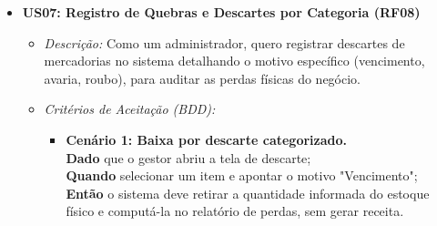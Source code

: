 \documentclass[
	12pt,				%
	openany,			%
	oneside,			%
	a4paper,			%
	english,			%
	french,				%
	spanish,			%
	brazil				%
	]{abntex2}
\begin{document}
\begin{itemize}
    \item \textbf{US07: Registro de Quebras e Descartes por Categoria (RF08)}
    \begin{itemize}
        \item \textit{Descrição:} Como um administrador, quero registrar descartes de mercadorias no sistema detalhando o motivo específico (vencimento, avaria, roubo), para auditar as perdas físicas do negócio.
        \item \textit{Critérios de Aceitação (BDD):}
        \begin{itemize}
            \item \textbf{Cenário 1: Baixa por descarte categorizado.} \\
            \textbf{Dado} que o gestor abriu a tela de descarte; \\
            \textbf{Quando} selecionar um item e apontar o motivo "Vencimento"; \\
            \textbf{Então} o sistema deve retirar a quantidade informada do estoque físico e computá-la no relatório de perdas, sem gerar receita.
        \end{itemize}
    \end{itemize}


\end{itemize}
\end{document}
